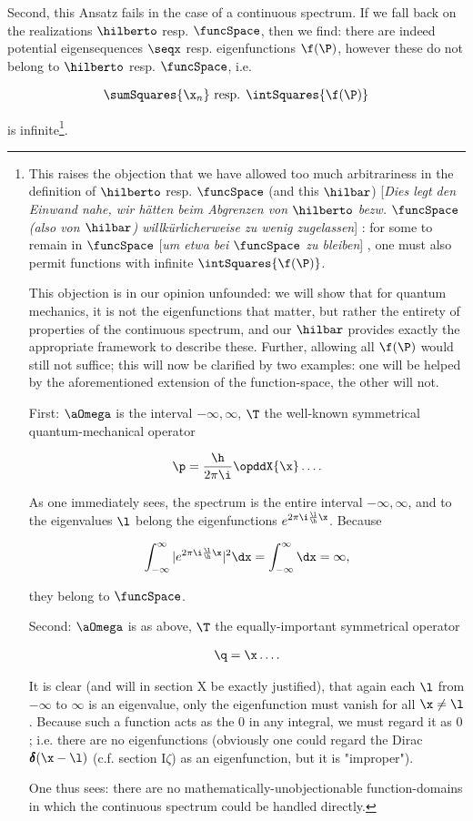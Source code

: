 \documentclass{article}
\newcommand{\WTF}[1]{
[\it{\small{#1}}]
}
\newcommand{\uequ}[1]{
\begin{align*}
#1
\end{align*}
}
\newcommand{\const}[1]{#1}
\newcommand{\func}[1]{\pmb{#1}}
\renewcommand{\it}[1]{\textit{#1}}
\newcommand{\intXY}[2]{\int_{#1}^{#2}}
\renewcommand{\exp}[1]{\const{e}^{#1}}
\newcommand{\ddelta}{\func{\delta}}
\begin{document}
Second, this Ansatz fails in the case of a continuous spectrum. If we fall back on the realizations $\hilberto$ resp. $\funcSpace$, then we find: there are indeed potential eigensequences $\seqx$ resp. eigenfunctions $\f(\P)$, however these do not belong to $\hilberto$ resp. $\funcSpace$, i.e.
\uequ{
\sumSquares{\x_n} \text{ resp. } \intSquares{\f(\P)}
}
is infinite\footnote{This raises the objection that we have allowed too much arbitrariness in the definition of $\hilberto$ resp. $\funcSpace$ (and this $\hilbar$)\WTF{Dies legt den Einwand nahe, wir hätten beim Abgrenzen von $\hilberto$ bezw. $\funcSpace$ (also von $\hilbar$) willkürlicherweise zu wenig zugelassen}: for some to remain in $\funcSpace$\WTF{um etwa bei $\funcSpace$ zu bleiben}, one must also permit functions with infinite $\intSquares{\f(\P)}$.

This objection is in our opinion unfounded: we will show that for quantum mechanics, it is not the eigenfunctions that matter, but rather the entirety of properties of the continuous spectrum, and our $\hilbar$ provides exactly the appropriate framework to describe these. Further, allowing all $\f(\P)$ would still not suffice; this will now be clarified by two examples: one will be helped by the aforementioned extension of the function-space, the other will not.

First: $\aOmega$ is the interval $-\infty,\infty$, $\T$ the well-known symmetrical quantum-mechanical operator
\uequ{
\p = \frac{\h}{2\pi\i}\opddX{\x}\dots.
}

As one immediately sees, the spectrum is the entire interval $-\infty,\infty$, and to the eigenvalues $\l$ belong the eigenfunctions $\exp{2\pi\i\frac{\l}{\h}\x}$. Because
\uequ{
\intXY{-\infty}{\infty}|\exp{2\pi\i\frac{\l}{\h}\x}|^2\dx = \intXY{-\infty}{\infty}\dx = \infty,
}
they belong to $\funcSpace$.

Second: $\aOmega$ is as above, $\T$ the equally-important symmetrical operator
\uequ{
\q = \x\dots.
}
It is clear (and will in section X be exactly justified), that again each $\l$ from $-\infty$ to $\infty$ is an eigenvalue, only the eigenfunction must vanish for all $\x \neq \l$. Because such a function acts as the $0$ in any integral, we must regard it as $0$; i.e. there are no eigenfunctions (obviously one could regard the Dirac $\ddelta(\x-\l)$ (c.f. section I$\zeta$) as an eigenfunction, but it is "improper").

One thus sees: there are no mathematically-unobjectionable function-domains in which the continuous spectrum could be handled directly.
}.
\end{document}
